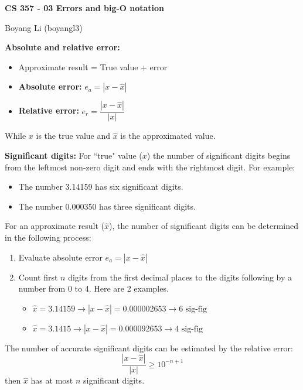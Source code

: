 \documentclass[12pt]{article}
\begin{document}
\begin{center}\Large\bf 
CS 357 - 03 Errors and big-O notation\\
\end{center}
\begin{center}
Boyang Li (boyangl3)
\end{center}

\medskip
\noindent \textbf{Absolute and relative error:}
    \begin{itemize}
        \item Approximate result = True value + error
        \item \textbf{Absolute error:} $e_a = |x - \hat{x}|$
        \item \textbf{Relative error:} $e_r = \dfrac{|x - \hat{x}|}{|x|}$
    \end{itemize}
    
    While $x$ is the true value and $\hat{x}$ is the approximated value.


\medskip
\noindent \textbf{Significant digits:} For ``true" value ($x$) the number of significant digits begins from the leftmost non-zero digit and ends with the rightmost digit. For example:
    \begin{itemize}
        \item The number 3.14159 has six significant digits.
        \item The number 0.000350 has three significant digits.
    \end{itemize}

    For an approximate result ($\hat{x}$), the number of significant digits can be determined in the following process:
    \begin{enumerate}
        \item Evaluate absolute error $e_a = |x - \hat{x}|$
        \item Count first $n$ digits from the first decimal places to the digits following by a number from 0 to 4. Here are 2 examples.
            \begin{itemize}
                \item $\hat{x} = 3.14159 \to |x - \hat{x}| = 0.000002653 \to \text{6 sig-fig}$
                \item $\hat{x} = 3.1415 \to |x - \hat{x}| = 0.000092653 \to \text{4 sig-fig}$
            \end{itemize}
    \end{enumerate}

    The number of accurate significant digits can be estimated by the relative error:
        $$\frac{|x - \hat{x}|}{|x|} \geq 10 ^{-n+1}$$
    then $\hat{x}$ has at most $n$ significant digits.
\end{document}
